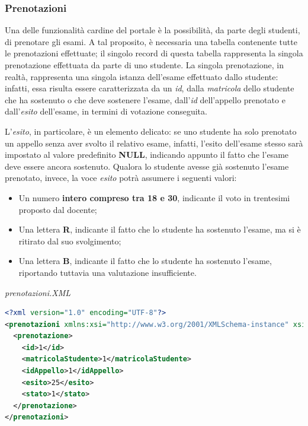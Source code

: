 \documentclass [a4paper,11pt]{book}
\begin{document}
\medskip

\subsubsection{Prenotazioni}

\label{sec:esito}

Una delle funzionalità cardine del portale è la possibilità, da parte degli studenti, di prenotare gli esami. A tal proposito, è necessaria una tabella contenente tutte le prenotazioni effettuate; il singolo record di questa tabella rappresenta la singola prenotazione effettuata da parte di uno studente. La singola prenotazione, in realtà, rappresenta una singola istanza dell'esame effettuato dallo studente: infatti, essa risulta essere caratterizzata da un \emph{id}, dalla \emph{matricola} dello studente che ha sostenuto o che deve sostenere l'esame, dall'\emph{id} dell'appello prenotato e dall'\emph{esito} dell'esame, in termini di votazione conseguita.

L'\emph{esito}, in particolare, è un elemento delicato: se uno studente ha solo prenotato un appello senza aver svolto il relativo esame, infatti, l'esito dell'esame stesso sarà impostato al valore predefinito \textbf{NULL}, indicando appunto il fatto che l'esame deve essere ancora sostenuto. Qualora lo studente avesse già sostenuto l'esame prenotato, invece, la voce \emph{esito} potrà assumere i seguenti valori:
\begin{itemize}
\item Un numero \textbf{intero compreso tra 18 e 30}, indicante il voto in trentesimi proposto dal docente;
\item Una lettera \textbf{R}, indicante il fatto che lo studente ha sostenuto l'esame, ma si è ritirato dal suo svolgimento;
\item Una lettera \textbf{B}, indicante il fatto che lo studente ha sostenuto l'esame, riportando tuttavia una valutazione insufficiente.
\end{itemize}

\medskip

\emph{prenotazioni.XML}

\label{sec:prenotazioni}

\begin{lstlisting}[language=XML]
<?xml version="1.0" encoding="UTF-8"?>
<prenotazioni xmlns:xsi="http://www.w3.org/2001/XMLSchema-instance" xsi:noNamespaceSchemaLocation="prenotazione.xsd">
  <prenotazione>
    <id>1</id>
    <matricolaStudente>1</matricolaStudente>
    <idAppello>1</idAppello>
    <esito>25</esito>
    <stato>1</stato>
  </prenotazione>
</prenotazioni>
\end{lstlisting}
\end{document}
